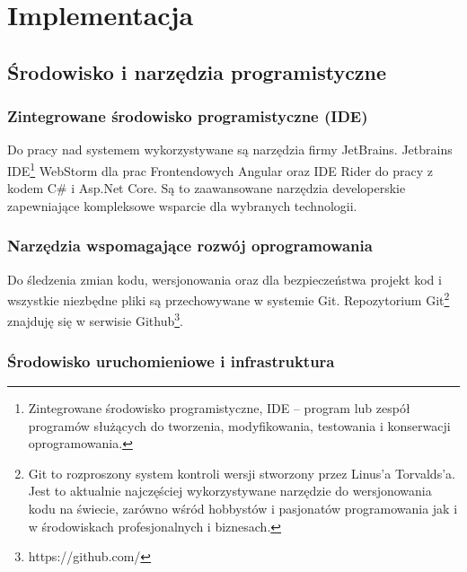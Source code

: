 \chapter{Implementacja}
\label{rozdzial4}

\section{Środowisko i narzędzia programistyczne}

\subsection{Zintegrowane środowisko programistyczne (IDE)}

Do pracy nad systemem wykorzystywane są narzędzia firmy JetBrains. Jetbrains IDE\footnote{Zintegrowane środowisko programistyczne, IDE – program lub zespół programów służących do tworzenia, modyfikowania, testowania i konserwacji oprogramowania.\cite{wikipedia.pl}} WebStorm dla prac Frontendowych Angular oraz IDE Rider do pracy z kodem C\# i Asp.Net Core. Są to zaawansowane narzędzia developerskie zapewniające kompleksowe wsparcie dla wybranych technologii.

\subsection{Narzędzia wspomagające rozwój oprogramowania}

Do śledzenia zmian kodu, wersjonowania oraz dla bezpieczeństwa projekt kod i wszystkie niezbędne pliki są przechowywane w systemie Git. Repozytorium Git\footnote{Git to rozproszony system kontroli wersji stworzony przez Linus'a Torvalds'a. Jest to aktualnie najczęściej wykorzystywane narzędzie do wersjonowania kodu na świecie, zarówno wśród hobbystów i pasjonatów programowania jak i w środowiskach profesjonalnych i biznesach.} znajduję się w serwisie Github\footnote{https://github.com/}.

\subsection{Środowisko uruchomieniowe i infrastruktura}

